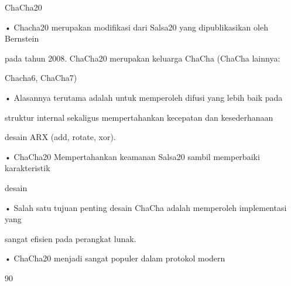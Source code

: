 \documentclass{article}
\begin{document}

ChaCha20

• Chacha20 merupakan modifikasi dari Salsa20 yang dipublikasikan oleh Bernstein 

pada tahun 2008.  ChaCha20 merupakan keluarga ChaCha (ChaCha lainnya: 

Chacha6, ChaCha7) 

• Alasannya terutama adalah untuk memperoleh difusi yang lebih baik pada 

struktur internal sekaligus mempertahankan kecepatan dan kesederhanaan 

desain ARX (add, rotate, xor).

• ChaCha20 Mempertahankan keamanan Salsa20 sambil memperbaiki karakteristik 

desain

• Salah satu tujuan penting desain ChaCha adalah memperoleh implementasi yang 

sangat efisien pada perangkat lunak.

• ChaCha20 menjadi sangat populer dalam protokol modern

90
\end{document}
